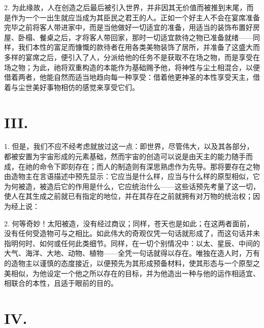 2. 为此缘故，人在创造之后最后被引入世界，并非因其无价值而被推到末尾，而是作为一个一出生就应当成为其臣民之君王的人。正如一个好主人不会在宴席准备完毕之前将客人带进家中，而是当他做好一切适宜的准备，用适当的装饰布置好房屋、卧榻、餐桌之后，才将客人带回家，那时一切适宜款待之物已准备就绪——同样，我们本性的富足而慷慨的款待者在用各类美物装饰了居所，并准备了这盛大而多样的宴席之后，便引入了人，分派给他的任务不是获取不在场之物，而是享受在场之物；为此，祂将双重构造的本能作为基础赐予他，将神性与尘土相混合，以便借着两者，他能自然而适当地趋向每一种享受：借着他更神圣的本性享受天主，借着与尘世美好事物相仿的感觉来享受它们。\par


\section{III. }

1. 但是，我们不应不经考虑就放过这一点：即世界，尽管伟大，以及其各部分，都被安置为宇宙形成的元素基础，然而宇宙的创造可以说是由天主的能力随手而成，在祂的命令下即刻存在；而人的制造则有深思熟虑作为先导。那将要存在之物由造物主在言语描述中预先显示：它应当是什么样，应当与什么样的原型相似，它为何被造，被造后它的作用是什么，它应统治什么——这些话预先考量了这一切，使人在其生成之前就已有指定的地位，并在其存在之前就拥有对万物的统治权；因为经上说：\par

2. 何等奇妙！太阳被造，没有经过商议；同样，苍天也是如此；在这两者面前，没有任何受造物可与之相比。如此伟大的奇观仅凭一句话就形成了，而这句话并未指明何时、如何或任何此类细节。同样，在一切个别情况中：以太、星辰、中间的大气、海洋、大地、动物、植物——全凭一句话就得以存在。唯独在造人时，万有的造物主以谨慎的态度接近，以便预先为其形成预备材料，使其形态与一个原型之美相似，为他设定一个他之所以存在的目标，并为他造出一种与他的运作相适宜、相联合的本性，且适于眼前的目的。\par


\section{IV. }

